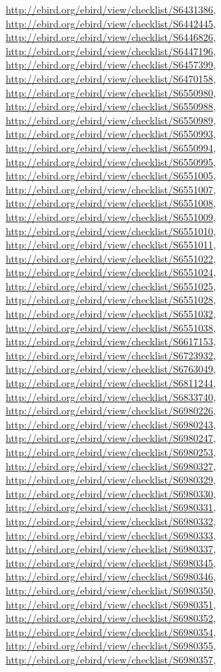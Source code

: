 \documentclass[9pt, article]{memoir}
\begin{document}
\begin{multicols}{2}
\url{http://ebird.org/ebird/view/checklist/S6431386}, 
\url{http://ebird.org/ebird/view/checklist/S6442445}, 
\url{http://ebird.org/ebird/view/checklist/S6446826}, 
\url{http://ebird.org/ebird/view/checklist/S6447196}, 
\url{http://ebird.org/ebird/view/checklist/S6457399}, 
\url{http://ebird.org/ebird/view/checklist/S6470158}, 
\url{http://ebird.org/ebird/view/checklist/S6550980}, 
\url{http://ebird.org/ebird/view/checklist/S6550988}, 
\url{http://ebird.org/ebird/view/checklist/S6550989}, 
\url{http://ebird.org/ebird/view/checklist/S6550993}, 
\url{http://ebird.org/ebird/view/checklist/S6550994}, 
\url{http://ebird.org/ebird/view/checklist/S6550995}, 
\url{http://ebird.org/ebird/view/checklist/S6551005}, 
\url{http://ebird.org/ebird/view/checklist/S6551007}, 
\url{http://ebird.org/ebird/view/checklist/S6551008}, 
\url{http://ebird.org/ebird/view/checklist/S6551009}, 
\url{http://ebird.org/ebird/view/checklist/S6551010}, 
\url{http://ebird.org/ebird/view/checklist/S6551011}, 
\url{http://ebird.org/ebird/view/checklist/S6551022}, 
\url{http://ebird.org/ebird/view/checklist/S6551024}, 
\url{http://ebird.org/ebird/view/checklist/S6551025}, 
\url{http://ebird.org/ebird/view/checklist/S6551028}, 
\url{http://ebird.org/ebird/view/checklist/S6551032}, 
\url{http://ebird.org/ebird/view/checklist/S6551038}, 
\url{http://ebird.org/ebird/view/checklist/S6617153}, 
\url{http://ebird.org/ebird/view/checklist/S6723932}, 
\url{http://ebird.org/ebird/view/checklist/S6763049}, 
\url{http://ebird.org/ebird/view/checklist/S6811244}, 
\url{http://ebird.org/ebird/view/checklist/S6833740}, 
\url{http://ebird.org/ebird/view/checklist/S6980226}, 
\url{http://ebird.org/ebird/view/checklist/S6980243}, 
\url{http://ebird.org/ebird/view/checklist/S6980247}, 
\url{http://ebird.org/ebird/view/checklist/S6980253}, 
\url{http://ebird.org/ebird/view/checklist/S6980327}, 
\url{http://ebird.org/ebird/view/checklist/S6980329}, 
\url{http://ebird.org/ebird/view/checklist/S6980330}, 
\url{http://ebird.org/ebird/view/checklist/S6980331}, 
\url{http://ebird.org/ebird/view/checklist/S6980332}, 
\url{http://ebird.org/ebird/view/checklist/S6980333}, 
\url{http://ebird.org/ebird/view/checklist/S6980337}, 
\url{http://ebird.org/ebird/view/checklist/S6980345}, 
\url{http://ebird.org/ebird/view/checklist/S6980346}, 
\url{http://ebird.org/ebird/view/checklist/S6980350}, 
\url{http://ebird.org/ebird/view/checklist/S6980351}, 
\url{http://ebird.org/ebird/view/checklist/S6980352}, 
\url{http://ebird.org/ebird/view/checklist/S6980354}, 
\url{http://ebird.org/ebird/view/checklist/S6980355}, 
\url{http://ebird.org/ebird/view/checklist/S6980357}, 

\end{multicols}
\end{document}
